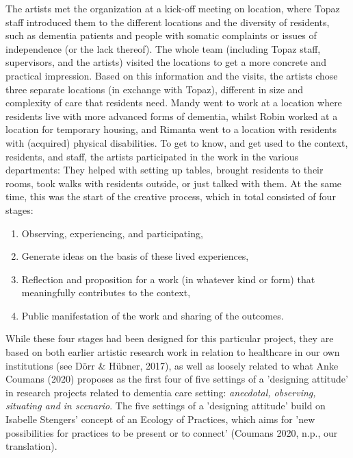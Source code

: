 \documentclass[authordate, empirical]{jote-new-article}
\begin{document}
	The artists met the organization at a kick-off meeting on location, where Topaz staff introduced them to the different locations and the diversity of residents, such as dementia patients and people with somatic complaints or issues of independence (or the lack thereof). The whole team (including Topaz staff, supervisors, and the artists) visited the locations to get a more concrete and practical impression. Based on this information and the visits, the artists chose three separate locations (in exchange with Topaz), different in size and complexity of care that residents need. Mandy went to work at a location where residents live with more advanced forms of dementia, whilst Robin worked at a location for temporary housing, and Rimanta went to a location with residents with (acquired) physical disabilities. To get to know, and get used to the context, residents, and staff, the artists participated in the work in the various departments: They helped with setting up tables, brought residents to their rooms, took walks with residents outside, or just talked with them. At the same time, this was the start of the creative process, which in total consisted of four stages:





	\begin{enumerate}


		\item Observing, experiencing, and participating,



		\item Generate ideas on the basis of these lived experiences,



		\item Reflection and proposition for a work (in whatever kind or form) that meaningfully contributes to the context,



		\item Public manifestation of the work and sharing of the outcomes.


	\end{enumerate}





	While these four stages had been designed for this particular project, they are based on both earlier artistic research work in relation to healthcare in our own institutions (see Dörr \& Hübner, 2017), as well as loosely related to what Anke Coumans (2020) proposes as the first four of five settings of a 'designing attitude' in research projects related to dementia care setting: \emph{anecdotal, observing, situating and in scenario}. The five settings of a 'designing attitude' build on Isabelle Stengers' concept of an Ecology of Practices, which aims for 'new possibilities for practices to be present or to connect' (Coumans 2020, n.p., our translation).
\end{document}

